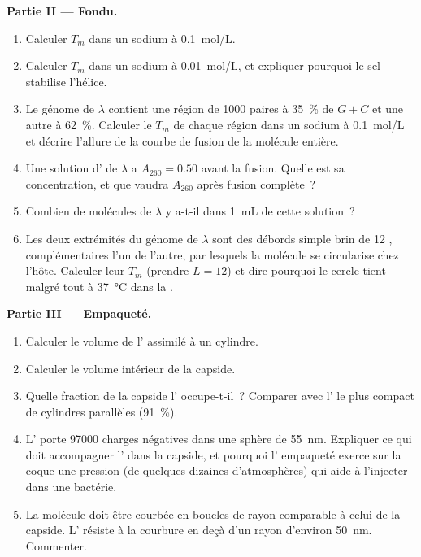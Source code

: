 \begin{problem}
\medskip
\noindent\textbf{Partie II --- Fondu.}
\begin{enumerate}[resume]
  \item Calculer $T_m$ dans un sodium à \qty{0.1}{mol/L}.
  \item Calculer $T_m$ dans un sodium à \qty{0.01}{mol/L}, et expliquer
        pourquoi le sel stabilise l'hélice.
  \item Le génome de $\lambda$ contient une région de \qty{1000}{}
        paires à \qty{35}{\%} de $G + C$ et une autre à \qty{62}{\%}.
        Calculer le $T_m$ de chaque région dans un sodium à
        \qty{0.1}{mol/L} et décrire l'allure de la courbe de fusion de
        la molécule entière.
  \item Une solution d' de $\lambda$ a $A_{260} = 0.50$ avant la
        fusion. Quelle est sa concentration, et que vaudra $A_{260}$
        après fusion complète~?
  \item Combien de molécules de $\lambda$ y a-t-il dans \qty{1}{mL} de
        cette solution~?
  \item Les deux extrémités du génome de $\lambda$ sont des débords
        simple brin de 12 , complémentaires l'un de l'autre,
        par lesquels la molécule se circularise chez l'hôte. Calculer
        leur $T_m$ (prendre $L = 12$) et dire pourquoi le cercle tient
        malgré tout à \qty{37}{\celsius} dans la .
\end{enumerate}

\medskip
\noindent\textbf{Partie III --- Empaqueté.}
\begin{enumerate}[resume]
  \item Calculer le volume de l' assimilé à un cylindre.
  \item Calculer le volume intérieur de la capside.
  \item Quelle fraction de la capside l' occupe-t-il~? Comparer avec
        l' le plus compact de cylindres parallèles
        (\qty{91}{\%}).
  \item L' porte \num{97000} charges négatives dans une sphère de
        \qty{55}{nm}. Expliquer ce qui doit accompagner l' dans la
        capside, et pourquoi l' empaqueté exerce sur la coque une
        pression (de quelques dizaines d'atmosphères) qui aide à
        l'injecter dans une bactérie.
  \item La molécule doit être courbée en boucles de rayon comparable à
        celui de la capside. L' résiste à la courbure en deçà d'un
        rayon d'environ \qty{50}{nm}. Commenter.
\end{enumerate}


\end{problem}
